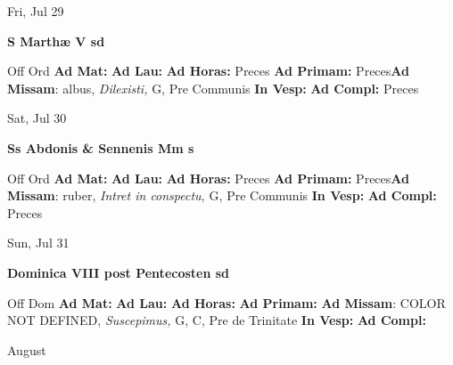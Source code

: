 \documentclass[10pt]{memoir}
\begin{document}
\begin{center}
\begin{minipage}{3.5in}
\vspace{2em}
\begin{center}Fri, Jul 29
\end{center}
\textbf{ \large S Marthæ V
\textnormal{\normalsize sd}}

\begin{justify}Off Ord
\textbf{Ad Mat: }
\textbf{Ad Lau: }
\textbf{Ad Horas: }Preces
\textbf{Ad Primam: }Preces\textbf{Ad Missam}: albus, \textit{Dilexisti,} G, Pre Communis
\textbf{In Vesp: }
\textbf{Ad Compl: }Preces
\end{justify}
\end{minipage}
\end{center}

\begin{center}
\begin{minipage}{3.5in}
\vspace{2em}
\begin{center}Sat, Jul 30
\end{center}
\textbf{ \large Ss Abdonis \& Sennenis Mm
\textnormal{\normalsize s}}

\begin{justify}Off Ord
\textbf{Ad Mat: }
\textbf{Ad Lau: }
\textbf{Ad Horas: }Preces
\textbf{Ad Primam: }Preces\textbf{Ad Missam}: ruber, \textit{Intret in conspectu,} G, Pre Communis
\textbf{In Vesp: }
\textbf{Ad Compl: }Preces
\end{justify}
\end{minipage}
\end{center}

\begin{center}
\begin{minipage}{3.5in}
\vspace{2em}
\begin{center}Sun, Jul 31
\end{center}
\textbf{ \large Dominica VIII post Pentecosten
\textnormal{\normalsize sd}}

\begin{justify}Off Dom
\textbf{Ad Mat: }
\textbf{Ad Lau: }
\textbf{Ad Horas: }
\textbf{Ad Primam: }\textbf{Ad Missam}: COLOR NOT DEFINED, \textit{Suscepimus,} G, C, Pre de Trinitate
\textbf{In Vesp: }
\textbf{Ad Compl: }
\end{justify}
\end{minipage}
\end{center}

\begin{center}
\pagebreak
\thispagestyle{empty}
{\Huge August}
\end{center}
                    
\end{document}
